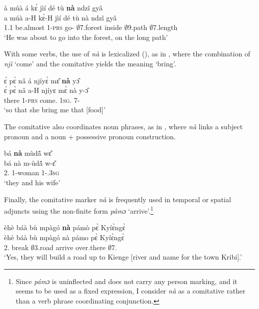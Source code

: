 \ea \label{COM5}
  \glll  à múà á kɛ́ jìí dé tù {\bfseries nà} ndzǐ gyâ    \\
          a múà a-H kɛ̀-H jìí dé tù nà ndzǐ gyâ      \\
       1.{\PST}1 be.almost 1-\textsc{prs} go-{\R} $\emptyset$7.forest {\LOC} inside {\COM} $\emptyset$9.path $\emptyset$7.length \\
    \trans `He was about to go into the forest, on the long path'
\z

With some verbs, the use of {\itshape nà} is lexicalized (), as in , where the combination of {\itshape njì} `come' and the comitative yields the meaning `bring'.

\ea \label{COM6}
  \glll   ɛ́ pɛ̀ nâ á njíyɛ̀ mɛ̂ {\bfseries nà} yɔ̂ \\
         ɛ́ pɛ̀ nâ a-H njíyɛ mɛ̀ nà y-ɔ̂ \\
         {\LOC} there {\COMP} 1-\textsc{prs} come.{\SBJV} 1\textsc{sg}.{\OBJ} {\COM} 7-{\OBJ}  \\
    \trans `so that she bring me that [food]'
\z


The comitative also coordinates noun phrases, as in , where {\itshape nà} links a subject pronoun and a noun + possessive pronoun construction.

\ea \label{COM7}
  \glll  bá {\bfseries nà} mùdã̂ wɛ̂ \\
         bá nà m-ùdã̂ w-ɛ̂\\
           2.{\SBJ} {\COM} 1-woman 1-{\POSS}.3\textsc{sg}  \\
    \trans `they and his wife'
\z

Finally, the comitative marker {\itshape nà} is frequently used in temporal or spatial adjuncts using the non-finite form {\itshape pámɔ} `arrive'.\footnote{Since {\itshape pámɔ} is uninflected and does not carry any person marking, and it seems to be used as a fixed expression, I consider {\itshape nà} as a comitative rather than a verb phrase coordinating conjunction.}

\ea \label{COM8}
  \glll èhè báà bù mpàgó {\bfseries nà} pámò pɛ̀ Kyíɛ̀ngɛ̀ \\
        èhè báà bù mpàgó nà pámo pɛ̀ Kyíɛ̀ngɛ̀ \\
        {\EXCL} 2.{\FUT} break $\emptyset$3.road {\COM} arrive over.there $\emptyset$7.{\PN}  \\
    \trans `Yes, they will build a road up to Kienge [river and name for the town Kribi].'
\z







